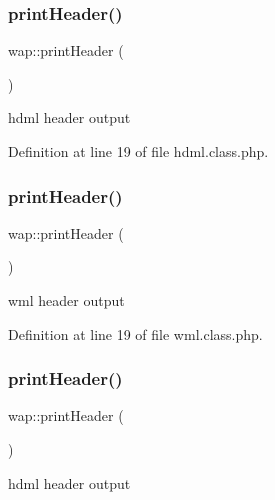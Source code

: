\subsubsection{\texorpdfstring{print\+Header()}{printHeader()}\hspace{0.1cm}{\footnotesize\ttfamily [1/3]}}
{\footnotesize\ttfamily wap\+::print\+Header (\begin{DoxyParamCaption}{ }\end{DoxyParamCaption})}



hdml header output 



Definition at line 19 of file hdml.\+class.\+php.

\hypertarget{classwap_a402c6a180ae759c7a173a67441dfb716}{}\label{classwap_a402c6a180ae759c7a173a67441dfb716} 
\subsubsection{\texorpdfstring{print\+Header()}{printHeader()}\hspace{0.1cm}{\footnotesize\ttfamily [2/3]}}
{\footnotesize\ttfamily wap\+::print\+Header (\begin{DoxyParamCaption}{ }\end{DoxyParamCaption})}



wml header output 



Definition at line 19 of file wml.\+class.\+php.

\hypertarget{classwap_a402c6a180ae759c7a173a67441dfb716}{}\label{classwap_a402c6a180ae759c7a173a67441dfb716} 
\subsubsection{\texorpdfstring{print\+Header()}{printHeader()}\hspace{0.1cm}{\footnotesize\ttfamily [3/3]}}
{\footnotesize\ttfamily wap\+::print\+Header (\begin{DoxyParamCaption}{ }\end{DoxyParamCaption})}



hdml header output 



